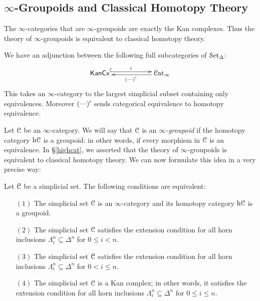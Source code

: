 \subsection{$\infty$-Groupoids and Classical Homotopy Theory}
\begin{1.2.5 inf-gpoids and classical homotopy}
\begin{shaded}
The $\infty$-categories that are $\infty$-groupoids are exactly the Kan complexes. Thus the theory of $\infty$-groupoids is equivalent to classical homotopy theory.

We have an adjunction between the following full subcategories of $\operatorname{\mathcal{S}et_{\Delta}}$:
\[\xymatrix@R=.3cm@C=2cm{
\mathsf{KanCx}  \ar@{^{(}->}@<.6ex>[r]^{i}&
\Cat_\infty  \ar@<.4ex>[l]^{(\DASH )'}\\
}\]
This takes an $\infty$-category to the largest simplicial subset containing only equivalences. Moreover $(\textup{---} )'$ sends categorical equivalence to homotopy equivalence.
\end{shaded}
Let $\operatorname{\mathcal{C}}$ be an $\infty$-category. We will say that $\operatorname{\mathcal{C}}$ is an {\it $\infty$-groupoid} if the homotopy category $\rm{h} \it{\operatorname{\mathcal{C}}}$ is a groupoid: in other words, if every morphism in $\operatorname{\mathcal{C}}$ is an equivalence. In \S \ref{highcat}, we asserted that the theory of $\infty$-groupoids is equivalent to classical homotopy theory. We can now formulate this idea in a very precise way:

\begin{proposition}\label{greenwich}
Let $\operatorname{\mathcal{C}}$ be a simplicial set. The following conditions are
equivalent:

\begin{itemize}
\item[$(1)$] The simplicial set $\operatorname{\mathcal{C}}$ is an $\infty$-category and its homotopy category $\rm{h} \it{\operatorname{\mathcal{C}}}$ is a groupoid.

\item[$(2)$] The simplicial set $\operatorname{\mathcal{C}}$ satisfies the extension condition
for all horn inclusions $\Lambda^n_i \subseteq \Delta^n$ for $0 \leq i < n$.

\item[$(3)$] The simplicial set $\operatorname{\mathcal{C}}$ satisfies the extension condition
for all horn inclusions $\Lambda^n_i \subseteq \Delta^n$ for $0 < i \leq n$.

\item[$(4)$] The simplicial set $\operatorname{\mathcal{C}}$ is a Kan complex; in other words, it
satisfies the extension condition for all horn inclusions
$\Lambda^n_i \subseteq \Delta^n$ for $0 \leq i \leq n$.
\end{itemize}
\end{proposition}


\end{1.2.5 inf-gpoids and classical homotopy}
